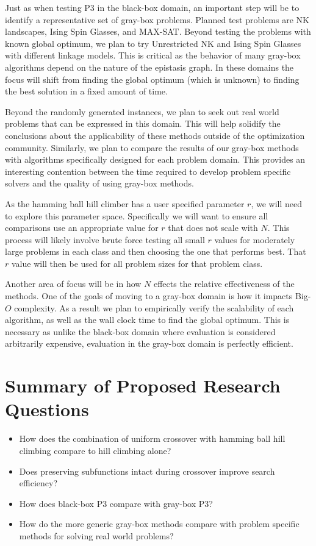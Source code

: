 Just as when testing P3 in the black-box domain, an important step will be to identify a representative set
of gray-box problems. Planned test problems are NK landscapes, Ising Spin Glasses, and MAX-SAT. Beyond testing the
problems with known global optimum, we plan to try Unrestricted NK and Ising Spin Glasses with different linkage models.
This is critical as the behavior of many gray-box algorithms depend on the nature of the epistasis graph. In these domains
the focus will shift from finding the global optimum (which is unknown) to finding the best solution in a fixed amount of time.

Beyond the randomly generated instances, we plan to seek out real world problems that can be expressed in this domain.
This will help solidify the conclusions about the applicability of these methods outside of the optimization community.
Similarly, we plan to compare the results of our gray-box methods with algorithms specifically designed for each problem
domain. This provides an interesting contention between the time required to develop problem specific solvers and the
quality of using gray-box methods.

As the hamming ball hill climber has a user specified parameter $r$, we will need to explore this parameter space.
Specifically we will want to ensure all comparisons use an appropriate value for $r$ that does not scale with
$N$. This process will likely involve brute force testing all small $r$ values for moderately large problems in each class
and then choosing the one that performs best. That $r$ value will then be used for all problem sizes for that problem class.

Another area of focus will be in how $N$ effects the relative effectiveness of the methods. One of the goals of moving
to a gray-box domain is how it impacts Big-$O$ complexity. As a result we plan to empirically verify the scalability
of each algorithm, as well as the wall clock time to find the global optimum. This is necessary as unlike the black-box
domain where evaluation is considered arbitrarily expensive, evaluation in the gray-box domain is perfectly efficient.

\section{Summary of Proposed Research Questions}
\begin{itemize}
\item How does the combination of uniform crossover with hamming ball hill climbing compare to hill climbing alone?
\item Does preserving subfunctions intact during crossover improve search efficiency?
\item How does black-box P3 compare with gray-box P3?
\item How do the more generic gray-box methods compare with problem specific methods for solving real world problems?
\end{itemize}
